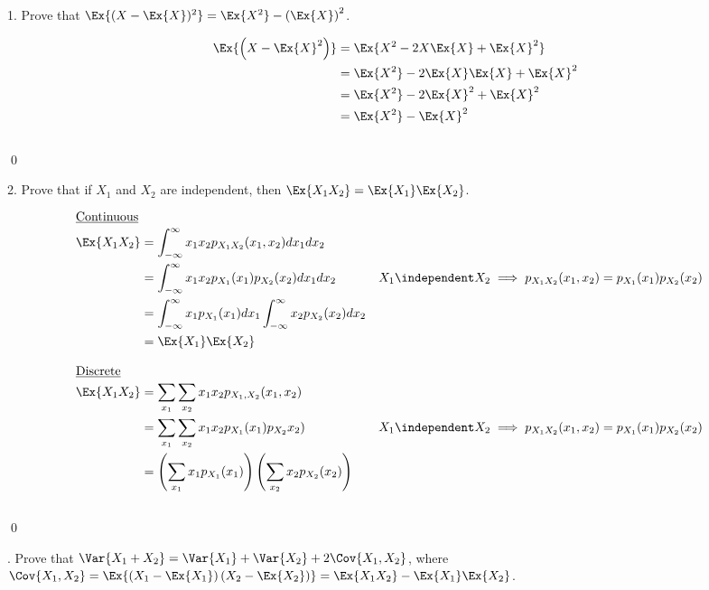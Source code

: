 \documentclass[12pt, letterpaper]{article}
\begin{document}
1. Prove that $\Ex{ (X - \Ex{X})^2} = \Ex{X^2} - \left( \Ex{X} \right)^2$.  

\begin{align*}
\Ex{ \left( X- \Ex{X}^2 \right) } & = \Ex{ X^2 - 2 X \Ex{ X} + \Ex{ X}^2 }
\\
& = \Ex{ X^2} - 2 \Ex{X} \Ex{X} + \Ex{X}^2 
\\
& = \Ex{X^2} - 2 \Ex{X}^2 + \Ex{X}^2
\\
& = \Ex{X^2} - \Ex{X}^2
\end{align*} \vspace{-48pt} \\ \qed 
\vspace{12pt} 

2. Prove that if $X_1$ and $X_2$ are independent, then $\Ex{X_1 X_2} = \Ex{X_1} \Ex{X_2}$. 
 
\begin{align*}
\omit\rlap{\underline{Continuous}}
\\
\Ex{ X_1 X_2} & = \int_{-\infty}^\infty x_1 x_2 p_{X_1 X_2} (x_1, x_2) dx_1 dx_2
\\
& = \int_{-\infty}^\infty x_1 x_2 p_{X_1}(x_1) p_{X_2} (x_2) dx_1 dx_2 
&& X_1 \independent X_2 \implies p_{X_1 X_2} (x_1, x_2) = p_{X_1}(x_1) p_{X_2} (x_2)
\\
& = \int_{-\infty}^\infty x_1 p_{X_1}(x_1) d x_1
\int_{-\infty}^\infty x_2 p_{X_2}(x_2) d x_2
\\
&= \Ex{ X_1 } \Ex{X_2 }
\\[2ex]
\omit\rlap{\underline{Discrete}} 
\\
\Ex{X_1 X_2} & = \sum_{x_1} \sum_{x_2} x_1 x_2 p_{X_1, X_2} (x_1, x_2) 
\\
& = \sum_{x_1} \sum_{x_2} x_1 x_2 p_{X_1} (x_1) p_{X_2}  x_2) 
&&  X_1 \independent X_2 \implies p_{X_1 X_2} (x_1, x_2) = p_{X_1}(x_1) p_{X_2} (x_2)
\\
& = \left( \sum_{x_1} x_1 p_{X_1}(x_1) \right)
\left( \sum_{x_2} x_2 p_{X_2}(x_2) \right)
\end{align*} \vspace{-48pt} \\ \qed 
 
. Prove that $\Var{X_1 + X_2} = \Var{X_1} + \Var{X_2} + 2\Cov{X_1, X_2}$, where $\Cov{X_1, X_2} = \Ex{ \left(X_1 - \Ex{X_1} \right) \left( X_2 - \Ex{ X_2} \right) } = \Ex{ X_1 X_2} - \Ex{X_1} \Ex{X_2}$. 
\end{document}
